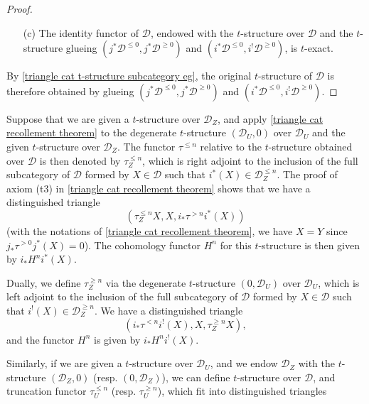 \begin{proof}
\begin{enumerate}
    \item[(c)] The identity functor of $\mathcal{D}$, endowed with the $t$-structure over $\mathcal{D}$ and the $t$-structure glueing $(j^*\mathcal{D}^{\leq 0},j^*\mathcal{D}^{\geq 0})$ and $(i^*\mathcal{D}^{\leq 0},i^!\mathcal{D}^{\geq 0})$, is $t$-exact.
\end{enumerate}
By \cref{triangle cat t-structure subcategory eg}, the original $t$-structure of $\mathcal{D}$ is therefore obtained by glueing $(j^*\mathcal{D}^{\leq 0},j^*\mathcal{D}^{\geq 0})$ and $(i^*\mathcal{D}^{\leq 0},i^!\mathcal{D}^{\geq 0})$.
\end{proof}

Suppose that we are given a $t$-structure over $\mathcal{D}_Z$, and apply \cref{triangle cat recollement theorem} to the degenerate $t$-structure $(\mathcal{D}_U,0)$ over $\mathcal{D}_U$ and the given $t$-structure over $\mathcal{D}_Z$. The functor $\tau^{\leq n}$ relative to the $t$-structure obtained over $\mathcal{D}$ is then denoted by $\tau^{\leq n}_Z$, which is right adjoint to the inclusion of the full subcategory of $\mathcal{D}$ formed by $X\in\mathcal{D}$ such that $i^*(X)\in\mathcal{D}_Z^{\leq n}$. The proof of axiom (t3) in \cref{triangle cat recollement theorem} shows that we have a distinguished triangle
\begin{equation}\label{triangle cat recollement truncation tau_Z^leq dt}
(\tau^{\leq n}_ZX,X,i_*\tau^{>n}i^*(X))
\end{equation}
(with the notations of \cref{triangle cat recollement theorem}, we have $X=Y$ since $j_*\tau^{>0}j^*(X)=0$). The cohomology functor $H^n$ for this $t$-structure is then given by $i_*H^ni^*(X)$.\par
Dually, we define $\tau^{\geq n}_Z$ via the degenerate $t$-structure $(0,\mathcal{D}_U)$ over $\mathcal{D}_U$, which is left adjoint to the inclusion of the full subcategory of $\mathcal{D}$ formed by $X\in\mathcal{D}$ such that $i^!(X)\in\mathcal{D}_Z^{\geq n}$. We have a distinguished triangle
\begin{equation}\label{triangle cat recollement truncation tau_Z^geq dt}
(i_*\tau^{<n}i^!(X),X,\tau^{\geq n}_ZX),
\end{equation}
and the functor $H^n$ is given by $i_*H^ni^!(X)$.\par
Similarly, if we are given a $t$-structure over $\mathcal{D}_U$, and we endow $\mathcal{D}_Z$ with the $t$-structure $(\mathcal{D}_Z,0)$ (resp. $(0,\mathcal{D}_Z)$), we can define $t$-structure over $\mathcal{D}$, and truncation functor $\tau^{\leq n}_U$ (resp. $\tau^{\geq n}_U$), which fit into distinguished triangles
